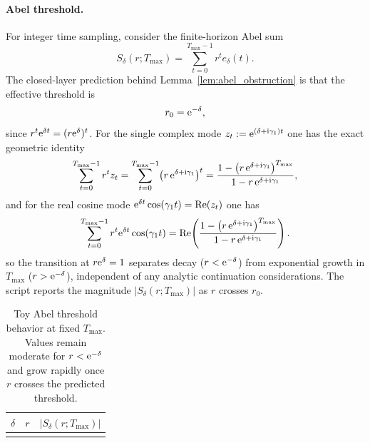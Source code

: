 \paragraph{Abel threshold.}
For integer time sampling, consider the finite-horizon Abel sum
\[
S_\delta(r;T_{\max})=\sum_{t=0}^{T_{\max}-1} r^t e_\delta(t).
\]
The closed-layer prediction behind Lemma~\ref{lem:abel_obstruction} is that the effective threshold is
\[
r_0=\mathrm{e}^{-\delta},
\]
since $r^t\mathrm{e}^{\delta t}=(r\mathrm{e}^\delta)^t$.
For the single complex mode $z_t:=\mathrm{e}^{(\delta+\mathrm{i}\gamma_1)t}$ one has the exact geometric identity
\[
\sum_{t=0}^{T_{\max}-1} r^t z_t=\sum_{t=0}^{T_{\max}-1}\bigl(r\,\mathrm{e}^{\delta+\mathrm{i}\gamma_1}\bigr)^t
=\frac{1-\bigl(r\,\mathrm{e}^{\delta+\mathrm{i}\gamma_1}\bigr)^{T_{\max}}}{1-r\,\mathrm{e}^{\delta+\mathrm{i}\gamma_1}},
\]
and for the real cosine mode $\mathrm{e}^{\delta t}\cos(\gamma_1 t)=\operatorname{Re}(z_t)$ one has
\[
\sum_{t=0}^{T_{\max}-1} r^t \mathrm{e}^{\delta t}\cos(\gamma_1 t)
=\operatorname{Re}\!\left(\frac{1-\bigl(r\,\mathrm{e}^{\delta+\mathrm{i}\gamma_1}\bigr)^{T_{\max}}}{1-r\,\mathrm{e}^{\delta+\mathrm{i}\gamma_1}}\right).
\]
so the transition at $r\mathrm{e}^\delta=1$ separates decay ($r<\mathrm{e}^{-\delta}$) from exponential growth in $T_{\max}$ ($r>\mathrm{e}^{-\delta}$), independent of any analytic continuation considerations.
The script reports the magnitude $|S_\delta(r;T_{\max})|$ as $r$ crosses $r_0$.

\begin{table}[t]
\centering
\begin{tabular}{@{}rcc@{}}
\toprule
$\delta$ & $r$ & $|S_\delta(r;T_{\max})|$ \\
\midrule

\\
\bottomrule
\end{tabular}
\caption{Toy Abel threshold behavior at fixed $T_{\max}$. Values remain moderate for $r<\mathrm{e}^{-\delta}$ and grow rapidly once $r$ crosses the predicted threshold.}
\label{tab:toy_abel}
\end{table}


